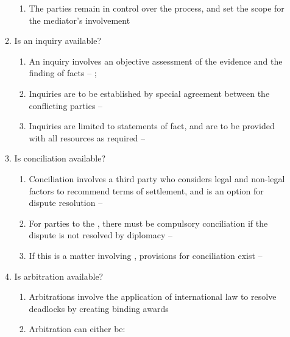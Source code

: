 \begin{enumerate}
\begin{enumerate}
\begin{enumerate}
            \item The parties remain in control over the process, and set the scope for the mediator's involvement
        \end{enumerate}
        \item Is an inquiry available?
        \begin{enumerate}
            \item An inquiry involves an objective assessment of the evidence and the finding of facts -- ; 
            \item Inquiries are to be established by special agreement between the conflicting parties -- 
            \item Inquiries are limited to statements of fact, and are to be provided with all resources as required -- 
        \end{enumerate}
        \item Is conciliation available?
        \begin{enumerate}
            \item Conciliation involves a third party who considers legal and non-legal factors to recommend terms of settlement, and is an option for dispute resolution -- 
            \item For parties to the , there must be compulsory conciliation if the dispute is not resolved by diplomacy -- 
            \item If this is a matter involving , provisions for conciliation exist -- 
        \end{enumerate}
        \item Is arbitration available?
        \begin{enumerate}
            \item Arbitrations involve the application of international law to resolve deadlocks by creating binding awards
            \item Arbitration can either be:

\end{enumerate}
\end{enumerate}
\end{enumerate}

